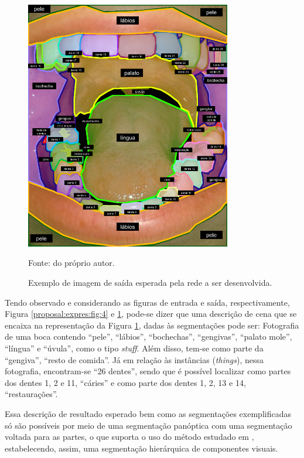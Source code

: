 \begin{figure}[H]
    \centering
    \caption{Exemplo de imagem de saída esperada pela rede a ser desenvolvida.}
    \includegraphics[height=4.3in]{recursos/imagens/proposal/boca_segmentada_v2.png}
    \label{proposal:expres:fig:5}

    \vspace*{1 cm}
    Fonte: do próprio autor.
\end{figure}

Tendo observado e considerando as figuras de entrada e saída, respectivamente, Figura \ref{proposal:expres:fig:4}
 e \ref{proposal:expres:fig:5}, pode-se dizer que uma descrição de cena que se encaixa na representação da Figura \ref{proposal:expres:fig:5}, dadas às segmentações pode ser: Fotografia de uma boca contendo ``pele'', ``lábios'', ``bochechas'', ``gengivas'', ``palato mole'', ``língua'' e ``úvula'', como o tipo \textit{stuff}. Além disso, tem-se como parte da ``gengiva'', ``resto de comida''. Já em relação às instâncias (\textit{things}), nessa fotografia, encontram-se ``26 dentes'', sendo que é possível localizar como partes dos dentes 1, 2 e 11, ``cáries'' e como parte dos dentes 1, 2, 13 e 14, ``restaurações''.

Essa descrição de resultado esperado bem como as segmentações exemplificadas só são possíveis por meio de uma segmentação panóptica com uma segmentação voltada para as partes, o que suporta o uso do método estudado em \cite{DeGeus2021}, estabelecendo, assim, uma segmentação hierárquica de componentes visuais.

